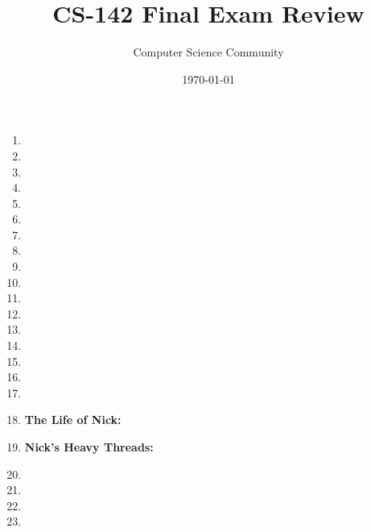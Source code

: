 \documentclass[11pt]{article}
\author{Computer Science Community}
\title{CS-142 Final Exam Review}
\date{\today}
\begin{document}
\header

\begin{enumerate}
\pagebreak
\item 

\item 

\item 

\item 

\pagebreak
\item 

\item 

\pagebreak
\item 
\vspace{1in}

\newpage
\item 

\item 

\item 

\item 

\item 

\item 

\item 

\item 

\item 

\item 

\item {\bf The Life of Nick:}
    

\pagebreak
\item {\bf Nick's Heavy Threads:}
	

\item 

\item 

\newpage
\item 

\item 

\end{enumerate}
\end{document}
